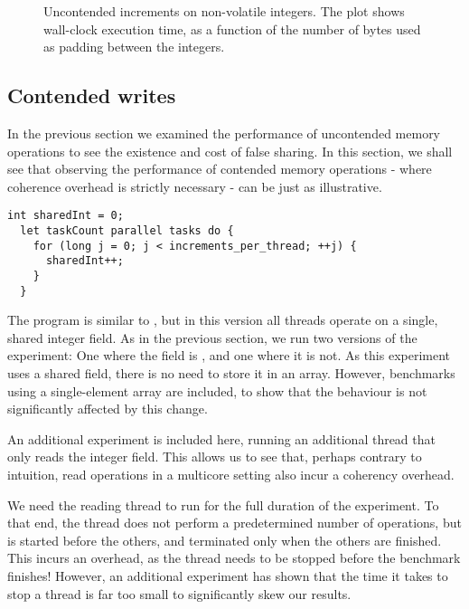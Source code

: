 \begin{figure}[hbpt]
\graphicspath{{plots/}}

\caption{Uncontended increments on non-volatile integers. The plot shows
	wall-clock execution time, as a function of the number of bytes used as padding
	between the integers.}
\label{fig:uncont-nob}
\end{figure}


\subsection{Contended writes}

In the previous section we examined the performance of uncontended memory
operations to see the existence and cost of false sharing. In this section, we
shall see that observing the performance of contended memory operations - where
coherence overhead is strictly necessary - can be just as illustrative.

\begin{code}
\begin{Verbatim}[frame=single]
  int sharedInt = 0;
  let taskCount parallel tasks do {
    for (long j = 0; j < increments_per_thread; ++j) {
      sharedInt++;
    }
  }
\end{Verbatim}
	\caption{Simplified code for the local-field version of the contended-writes
	experiment.}
\end{code}

The program is similar to , but in this
version all threads operate on a single, shared integer field. As in the previous
section, we run two versions of the experiment: One where the field is
, and one where it is not. As this experiment uses a shared field,
there is no need to store it in an array. However, benchmarks using a
single-element array are included, to show that the behaviour is not
significantly affected by this change.

An additional experiment is included here, running an additional thread that
only reads the integer field. This allows us to see that, perhaps contrary to
intuition, read operations in a multicore setting also incur a coherency
overhead.


We need the reading thread to run for the full duration of the experiment. To
that end, the thread does not perform a predetermined number of operations, but
is started before the others, and terminated only when the others are
finished. This incurs an overhead, as the thread needs to be stopped before the
benchmark finishes! However, an additional experiment has shown that the time it
takes to stop a thread is far too small to significantly skew our results.

